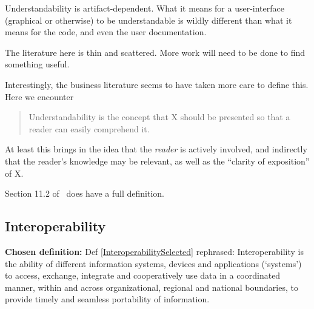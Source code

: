 \documentclass[letterpaper,cleveref]{lipics-v2019}
\theoremstyle{definition}
\begin{document}
Understandability is artifact-dependent. What it means for a user-interface (graphical
or otherwise) to be understandable is wildly different than what it means for the code,
and even the user documentation.

The literature here is thin and scattered.  More work will need to be done to find
something useful.

Interestingly, the business literature seems to have taken more care to define this.
Here we encounter
\begin{quote}
Understandability is the concept that X should be presented
so that a reader can easily comprehend it.
\end{quote}
At least this brings in the idea that the \emph{reader} is actively involved, and
indirectly that the reader's knowledge may be relevant, as well as the
``clarity of exposition'' of X.

Section 11.2 of~\cite{adams2015nonfunctional} does have a full definition.

\subsection{Interoperability}
\noindent \textbf{Chosen definition:} Def \ref{InteroperabilitySelected} rephrased: Interoperability is the ability of different information systems, devices and applications (‘systems’) to access, exchange, integrate and cooperatively use data in a coordinated manner, within and across organizational, regional and national boundaries, to provide timely and seamless portability of information.
\end{document}
